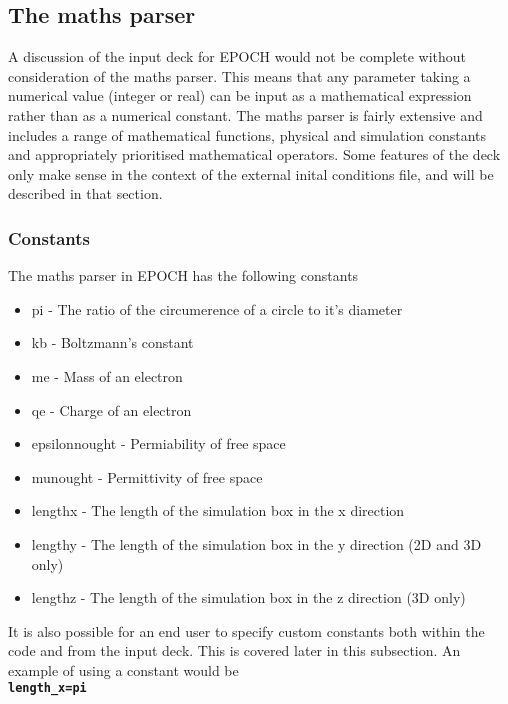 \documentclass[12pt]{article}
\newcommand{\inlinecode}[1]{{\color{warwickred} \bf\texttt{#1}}}
\newcommand{\nEPOCH}{{\color{warwickdark}\fontfamily{phv}\selectfont EPOCH}}
\newcommand{\EPOCH}{{\nEPOCH} }
\begin{document}
\subsection{The maths parser}
A discussion of the input deck for \EPOCH would not be complete without
consideration of the maths parser. This means that any parameter taking a
numerical value (integer or real) can be input as a mathematical expression
rather than as a numerical constant. The maths parser is fairly extensive and
includes a range of mathematical functions, physical and simulation constants
and appropriately prioritised mathematical operators. Some features of the
deck only make sense in the context of the external inital conditions file,
and will be described in that section.

\subsubsection{Constants}
The maths parser in \EPOCH  has the following constants
\begin{itemize}
\item pi - The ratio of the circumerence of a circle to it's diameter
\item kb - Boltzmann's constant
\item me - Mass of an electron
\item qe - Charge of an electron
\item epsilonnought - Permiability of free space
\item munought - Permittivity of free space
\item lengthx - The length of the simulation box in the x direction
\item lengthy - The length of the simulation box in the y direction (2D and 3D
  only)
\item lengthz - The length of the simulation box in the z direction (3D only)
\end{itemize}

It is also possible for an end user to specify custom constants both within
the code and from the input deck. This is covered later in this subsection. An
example of using a constant would be\\
\inlinecode{length\_x=pi}\\
\end{document}
